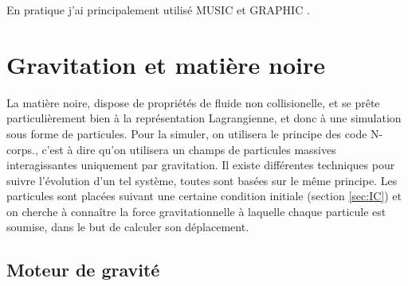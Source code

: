 En pratique j'ai principalement utilisé MUSIC \citep{hahn_multi-scale_2011} et GRAPHIC \citep{2008ApJS..178..179P}.



%
%

%
%


\section{Gravitation et matière noire}
\label{sec:solverDM}

La matière noire, dispose de propriétés de fluide non collisionelle, et se prête particulièrement bien à la représentation Lagrangienne, et donc à une simulation sous forme de particules.
Pour la simuler, on utilisera le principe des code N-corps., c'est à dire qu'on utilisera un champs de particules massives interagissantes uniquement par gravitation.
Il existe différentes techniques pour suivre l'évolution d'un tel système, toutes sont basées sur le même principe.
Les particules sont placées suivant une certaine condition initiale (section \ref{sec:IC}) et on cherche à connaître la force gravitationnelle à laquelle chaque particule est soumise, dans le but de calculer son déplacement.


\subsection{Moteur de gravité}
\label{sec:gravity}


